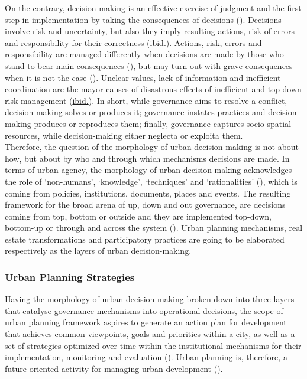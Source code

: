 \documentclass[11pt]{report}
\begin{document}
On the contrary, decision-making is an effective exercise of judgment and the first step in implementation by taking the consequences of decisions (\href{Knight}{\citealt{Knight 1964}}).
Decisions involve risk and uncertainty, but also they imply resulting actions, risk of errors and responsibility for their correctness (\href{Knight}{ibid.}).
Actions, risk, errors and responsibility are managed differently when decisions are made by those who stand to bear main consequences (\href{Meppem}{\cite{Meppem and Gill, 1998 ????}}), but may turn out with grave consequences when it is not the case (\href{Friend}{\citealt{friend_planning_2005}}).  Unclear values, lack of information and inefficient coordination are the mayor causes of disastrous effects of inefficient and top-down risk management (\href{Friend}{ibid.}).
In short, while governance aims to resolve a conflict, decision-making solves or produces it; governance instates practices and decision-making produces or reproduces them; finally, governance captures socio-spatial resources, while decision-making either neglecta or exploita them.
\\

Therefore, the question of the morphology of urban decision-making is not about how, but about by who and through which mechanisms decisions are made.
In terms of urban agency, the morphology of urban decision-making acknowledges the role of ‘non-humans’, ‘knowledge’, ‘techniques’ and ‘rationalities’ (\href{Healey}{\citealt{healey_circuits_2013}}), which is coming from policies, institutions, documents, places and events.
The resulting framework for the broad arena of up, down and out governance, are decisions coming from top, bottom or outside and they are implemented top-down, bottom-up or through and across the system
(\href{Hudson}{\citealt{hudson_political_2014}}).
Urban planning mechanisms, real estate transformations and participatory practices are going to be elaborated respectively as the layers of urban decision-making.

\subsubsection{Urban Planning Strategies}

Having the morphology of urban decision making broken down into three layers that catalyse governance mechanisms into operational decisions, the scope of urban  planning  framework aspires  to  generate  an  action  plan  for  development  that  achieves  common viewpoints,  goals  and  priorities  within  a city,  as  well  as  a  set  of  strategies  optimized  over  time  within  the institutional mechanisms for their implementation, monitoring and evaluation (\href{Fisher}{\citealt{fisher_building_2001}}).
Urban planning is, therefore, a future-oriented activity for managing urban development (\href{Nedovic}{\citealt{Nedovic-Budic_Mornings_2011}}). 
\\
\end{document}

